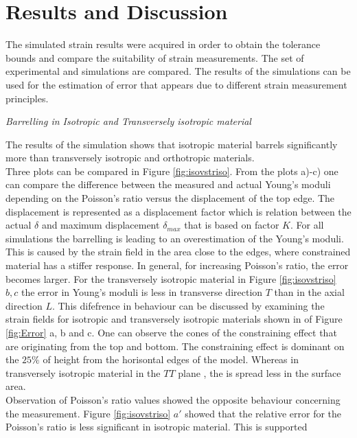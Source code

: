 \documentclass[review]{elsarticle}
\begin{document}
\section{Results and Discussion}
The simulated strain results were acquired in order to obtain the tolerance
bounds and compare the suitability of strain measurements.
The set of experimental and simulations are compared. The results of the simulations can be used for the
estimation of error that appears due to different strain measurement principles.

\begin{description}
\item{\textit{ Barrelling in Isotropic and Transversely isotropic material}}
\end{description}
The results of the simulation shows that isotropic material barrels
significantly more than transversely isotropic and orthotropic materials. \\	
Three plots can be compared in Figure \ref{fig:isovstriso}. 
From the plots a)-c) one can compare the difference between the measured and actual 
Young's moduli depending on the Poisson's ratio versus the
displacement of the top edge. The displacement is represented as a displacement
factor which is relation between the actual $\delta$ and maximum
displacement $\delta_{max}$ that is based on factor $K$. For all simulations the
barrelling is leading to an overestimation of the Young's moduli. This is caused by the strain field in the area close to the edges, where constrained material has a stiffer response.
In general, for increasing Poisson's ratio, the error becomes larger. 
For the transversely isotropic material in Figure
\ref{fig:isovstriso} $b,c$ the error in Young's moduli is less in
transverse direction $T$ than in the axial direction $L$.
This difefrence in behaviour can be discussed by examining the strain fields for isotropic and 
transversely isotropic materials shown in of Figure
\ref{fig:Error} a, b and c. One can
observe the cones of the constraining effect that are originating from the top
and bottom. The constraining effect is dominant on the $25\%$ of height
from the horisontal edges of the model. Whereas in transversely isotropic
material in the $TT$ plane , the is spread less in the surface area.\\
Observation of Poisson's ratio values showed the opposite behaviour concerning
the measurement.
Figure \ref{fig:isovstriso} $a'$ showed that the relative error for the
Poisson's ratio is less significant in isotropic material. This is supported
\end{document}
